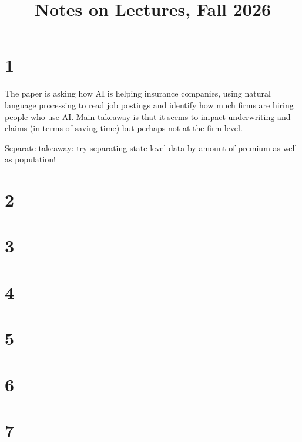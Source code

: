 \documentclass[12pt, letterpaper, parskip = full]{article}
\title{Notes on Lectures, Fall 2026}
\begin{document}
    \maketitle

    \section{1}

    The paper is asking how AI is helping insurance companies, using natural language processing to read job postings and identify how much firms are hiring people who use AI. Main takeaway is that it seems to impact underwriting and claims (in terms of saving time) but perhaps not at the firm level.

    Separate takeaway: try separating state-level data by amount of premium as well as population!

    \section{2}

    \section{3}

    \section{4}

    \section{5}

    \section{6}

    \section{7}
\end{document}
